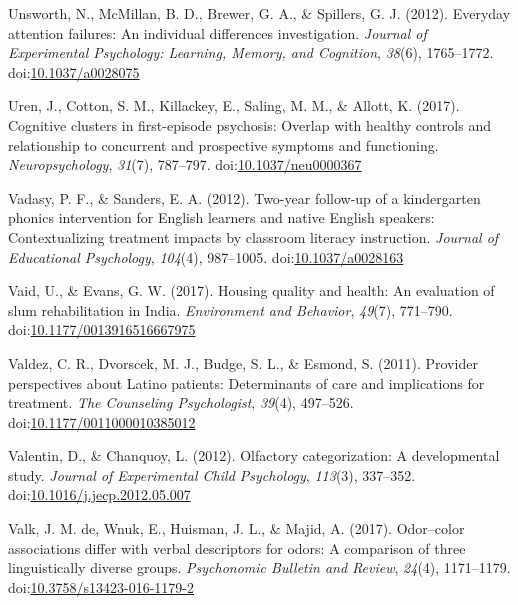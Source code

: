\documentclass[english,man]{apa6}
\theoremstyle{definition}
\theoremstyle{definition}
\theoremstyle{definition}
\theoremstyle{remark}
\begin{document}
\hypertarget{ref-Unsworth2012}{}
Unsworth, N., McMillan, B. D., Brewer, G. A., \& Spillers, G. J. (2012).
Everyday attention failures: An individual differences investigation.
\emph{Journal of Experimental Psychology: Learning, Memory, and
Cognition}, \emph{38}(6), 1765--1772.
doi:\href{https://doi.org/10.1037/a0028075}{10.1037/a0028075}

\hypertarget{ref-Uren2017}{}
Uren, J., Cotton, S. M., Killackey, E., Saling, M. M., \& Allott, K.
(2017). Cognitive clusters in first-episode psychosis: Overlap with
healthy controls and relationship to concurrent and prospective symptoms
and functioning. \emph{Neuropsychology}, \emph{31}(7), 787--797.
doi:\href{https://doi.org/10.1037/neu0000367}{10.1037/neu0000367}

\hypertarget{ref-Vadasy2012}{}
Vadasy, P. F., \& Sanders, E. A. (2012). Two-year follow-up of a
kindergarten phonics intervention for English learners and native
English speakers: Contextualizing treatment impacts by classroom
literacy instruction. \emph{Journal of Educational Psychology},
\emph{104}(4), 987--1005.
doi:\href{https://doi.org/10.1037/a0028163}{10.1037/a0028163}

\hypertarget{ref-Vaid2017}{}
Vaid, U., \& Evans, G. W. (2017). Housing quality and health: An
evaluation of slum rehabilitation in India. \emph{Environment and
Behavior}, \emph{49}(7), 771--790.
doi:\href{https://doi.org/10.1177/0013916516667975}{10.1177/0013916516667975}

\hypertarget{ref-Valdez2011}{}
Valdez, C. R., Dvorscek, M. J., Budge, S. L., \& Esmond, S. (2011).
Provider perspectives about Latino patients: Determinants of care and
implications for treatment. \emph{The Counseling Psychologist},
\emph{39}(4), 497--526.
doi:\href{https://doi.org/10.1177/0011000010385012}{10.1177/0011000010385012}

\hypertarget{ref-Valentin2012}{}
Valentin, D., \& Chanquoy, L. (2012). Olfactory categorization: A
developmental study. \emph{Journal of Experimental Child Psychology},
\emph{113}(3), 337--352.
doi:\href{https://doi.org/10.1016/j.jecp.2012.05.007}{10.1016/j.jecp.2012.05.007}

\hypertarget{ref-DeValk2016}{}
Valk, J. M. de, Wnuk, E., Huisman, J. L., \& Majid, A. (2017).
Odor--color associations differ with verbal descriptors for odors: A
comparison of three linguistically diverse groups. \emph{Psychonomic
Bulletin and Review}, \emph{24}(4), 1171--1179.
doi:\href{https://doi.org/10.3758/s13423-016-1179-2}{10.3758/s13423-016-1179-2}
\end{document}
